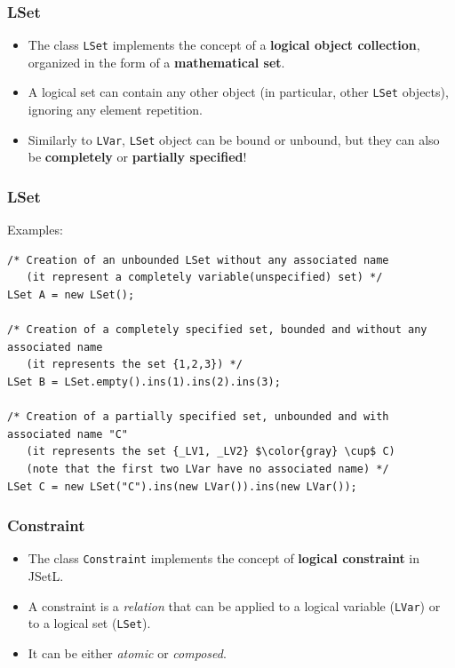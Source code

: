 \documentclass{beamer}
\begin{document}
\begin{frame}[fragile]
\frametitle{LSet}
\begin{itemize}
\setlength\itemsep{2em}
\item The class \texttt{LSet} implements the concept of a \textbf{logical object collection}, organized in the form of a \textbf{mathematical set}.\\
\item A logical set can contain any other object (in particular, other \texttt{LSet} objects), ignoring any element repetition.\\
\item Similarly to \texttt{LVar}, \texttt{LSet} object can be bound or unbound, but they can also be \textbf{completely} or \textbf{partially specified}!\\

\end{itemize}

\end{frame}

\begin{frame}[fragile]
\frametitle{LSet}
Examples:\\

\begin{lstlisting}[mathescape]
/* Creation of an unbounded LSet without any associated name
   (it represent a completely variable(unspecified) set) */
LSet A = new LSet();

/* Creation of a completely specified set, bounded and without any associated name
   (it represents the set {1,2,3}) */
LSet B = LSet.empty().ins(1).ins(2).ins(3);

/* Creation of a partially specified set, unbounded and with associated name "C"
   (it represents the set {_LV1, _LV2} $\color{gray} \cup$ C)
   (note that the first two LVar have no associated name) */
LSet C = new LSet("C").ins(new LVar()).ins(new LVar());
\end{lstlisting}

\end{frame}




\begin{frame}[fragile]
\frametitle{Constraint}
\begin{itemize}
\setlength\itemsep{2em}
\item The class \texttt{Constraint} implements the concept of \textbf{logical constraint} in JSetL.\\
\item A constraint is a \emph{relation} that can be applied to a logical variable (\texttt{LVar}) or to a logical set (\texttt{LSet}).\\
\item It can be either \emph{atomic} or \emph{composed}.\\
\end{itemize}
\end{frame}
\end{document}
